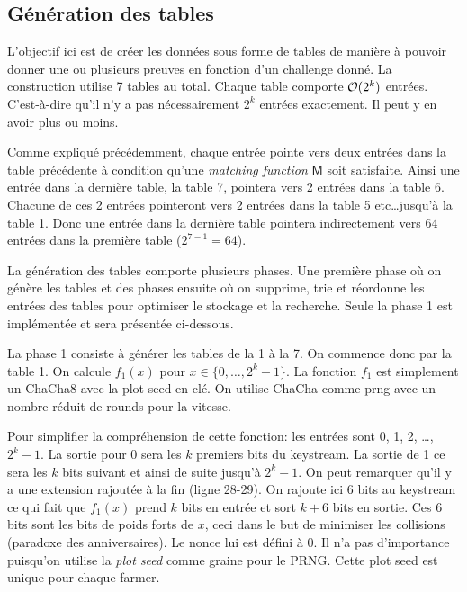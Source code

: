 \subsection{Génération des tables}

L'objectif ici est de créer les données sous forme de tables de manière à pouvoir donner une ou plusieurs preuves en fonction d'un challenge donné. La construction utilise 7 tables au total. Chaque table comporte $\mathcal{O}(2^k)$ entrées. C'est-à-dire qu'il n'y a pas nécessairement $2^k$ entrées exactement. Il peut y en avoir plus ou moins.

Comme expliqué précédemment, chaque entrée pointe vers deux entrées dans la table précédente à condition qu'une \emph{matching function} $\mathsf{M}$ soit satisfaite. Ainsi une entrée dans la dernière table, la table 7, pointera vers 2 entrées dans la table 6. Chacune de ces 2 entrées pointeront vers 2 entrées dans la table 5 etc\dots jusqu'à la table 1. Donc une entrée dans la dernière table pointera indirectement vers 64 entrées dans la première table ($2^{7-1} = 64$).

La génération des tables comporte plusieurs phases. Une première phase où on génère les tables et des phases ensuite où on supprime, trie et réordonne les entrées des tables pour optimiser le stockage et la recherche. Seule la phase 1 est implémentée et sera présentée ci-dessous.

La phase 1 consiste à générer les tables de la 1 à la 7. On commence donc par la table 1. On calcule $f_1(x)$ pour $x \in \{0,\dots,2^k-1\}$. La fonction $f_1$ est simplement un ChaCha8 avec la plot seed en clé. On utilise ChaCha comme \acrshort{prng} avec un nombre réduit de rounds pour la vitesse.


Pour simplifier la compréhension de cette fonction: les entrées sont 0, 1, 2, \dots, $2^k-1$. La sortie pour 0 sera les $k$ premiers bits du keystream. La sortie de 1 ce sera les $k$ bits suivant et ainsi de suite jusqu'à $2^k-1$. On peut remarquer qu'il y a une extension rajoutée à la fin (ligne 28-29). On rajoute ici 6 bits au keystream ce qui fait que $f_1(x)$ prend $k$ bits en entrée et sort $k+6$ bits en sortie. Ces 6 bits sont les bits de poids forts de $x$, ceci dans le but de minimiser les collisions (paradoxe des anniversaires). Le nonce lui est défini à 0. Il n'a pas d'importance puisqu'on utilise la \emph{plot seed} comme graine pour le PRNG. Cette plot seed est unique pour chaque farmer.

